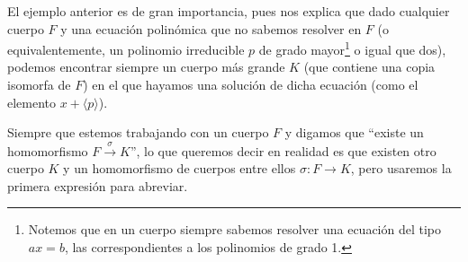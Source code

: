 El ejemplo anterior es de gran importancia, pues nos explica que dado cualquier cuerpo $F$ y una ecuación polinómica que no sabemos resolver en $F$ (o equivalentemente, un polinomio irreducible $p$ de grado mayor\footnote{Notemos que en un cuerpo siempre sabemos resolver una ecuación del tipo $ax=b$, las correspondientes a los polinomios de grado 1.} o igual que dos), podemos encontrar siempre un cuerpo más grande $K$ (que contiene una copia isomorfa de $F$) en el que hayamos una solución de dicha ecuación (como el elemento $x+\langle p \rangle $).

\begin{notacion}
    Siempre que estemos trabajando con un cuerpo $F$ y digamos que ``existe un homomorfismo $F\stackrel{\sigma}{\to}K$'', lo que queremos decir en realidad es que existen otro cuerpo $K$ y un homomorfismo de cuerpos entre ellos $\sigma:F\to K$, pero usaremos la primera expresión para abreviar.
\end{notacion}

